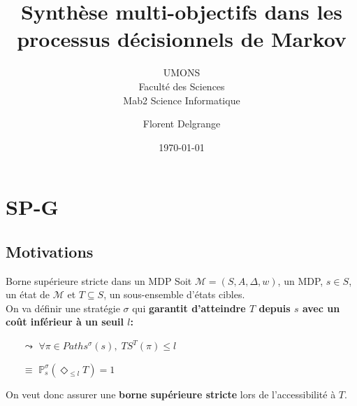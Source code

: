 \documentclass[compress]{beamer}
\title{Synthèse multi-objectifs dans les processus décisionnels de Markov} %
\author{Florent Delgrange}
\subtitle{\normalsize UMONS \\ Faculté des Sciences \\ Mab2 Science Informatique}
\date{\today}
\begin{document}
  \begin{frame}[plain]
    \maketitle
  \end{frame}

  \AtBeginSection[]
    {
      \begin{frame}{\contentsname}
      \vspace{-0.05\linewidth}
      \begin{multicols}{2}
      \tableofcontents[currentsection]
      \end{multicols}
      \end{frame}
    }

\section{SP-G}
\subsection{Motivations}
\begin{frame}{Borne supérieure stricte dans un MDP}
  Soit $\mathcal{M} = (S, A, \Delta, w)$, un MDP, $s \in S$, un état de $\mathcal{M}$ et $T \subseteq S$, un sous-ensemble d'états cibles.\\ On va définir une stratégie $\sigma$ qui
    \textbf{\color{fibeamer@orange}garantit d'atteindre $T$ depuis $s$ avec un coût inférieur à un seuil $l$:}
    \begin{itemize}
      \item[$\leadsto$] $\forall \pi \in Paths^\sigma(s), \; TS^T(\pi) \leq l$
      \item[$\equiv$] $\mathbb{P}_s^\sigma (\Diamond_{\leq l} T ) = 1$
    \end{itemize}
On veut donc assurer une \textbf{\color{fibeamer@orange}borne supérieure stricte}
lors de l'accessibilité à $T$.
\end{frame}
\end{document}
